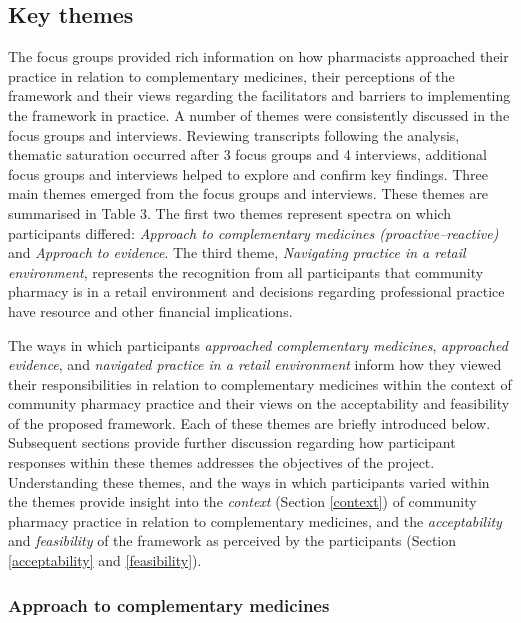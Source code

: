 \documentclass[11pt,a4paper]{article}
\begin{document}
\subsection{Key themes}\label{key-themes}

The focus groups provided rich information on how pharmacists approached
their practice in relation to complementary medicines, their perceptions
of the framework and their views regarding the facilitators and barriers
to implementing the framework in practice. A number of themes were
consistently discussed in the focus groups and interviews. Reviewing
transcripts following the analysis, thematic saturation occurred after 3
focus groups and 4 interviews, additional focus groups and interviews
helped to explore and confirm key findings. Three main themes emerged
from the focus groups and interviews. These themes are summarised in
Table 3. The first two themes represent spectra on which participants
differed: \emph{Approach to complementary medicines
(proactive--reactive)} and \emph{Approach to evidence}. The third theme,
\emph{Navigating practice in a retail environment}, represents the
recognition from all participants that community pharmacy is in a retail
environment and decisions regarding professional practice have resource
and other financial implications.



The ways in which participants \emph{approached complementary
medicines}, \emph{approached evidence}, and \emph{navigated practice in
a retail environment} inform how they viewed their responsibilities in
relation to complementary medicines within the context of community
pharmacy practice and their views on the acceptability and feasibility
of the proposed framework. Each of these themes are briefly introduced
below. Subsequent sections provide further discussion regarding how
participant responses within these themes addresses the objectives of
the project. Understanding these themes, and the ways in which
participants varied within the themes provide insight into the
\emph{context} (Section \ref{context}) of community pharmacy practice in
relation to complementary medicines, and the \emph{acceptability} and
\emph{feasibility} of the framework as perceived by the participants
(Section \ref{acceptability} and \ref{feasibility}).

\subsubsection{Approach to complementary
medicines}\label{approach-to-complementary-medicines}
\end{document}
